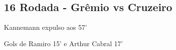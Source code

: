 \newpage
\subsection{16 Rodada - Grêmio vs Cruzeiro}

\begin{figure}[H]
    \centering
    
\end{figure}

Kannemann expulso aos 57'

Gols de Ramiro 15' e Arthur Cabral 17'